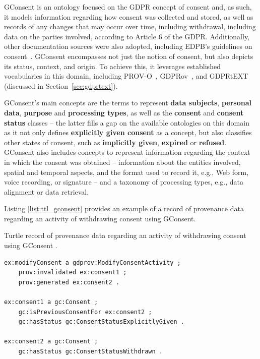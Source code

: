 GConsent \citep{hitzler_gconsent_2019} is an ontology focused on the GDPR concept of consent and, as such, it models information regarding how consent was collected and stored, as well as records of any changes that may occur over time, including withdrawal, including data on the parties involved, according to Article 6 of the GDPR.
Additionally, other documentation sources were also adopted, including EDPB's guidelines on consent~\citep{european_data_protection_board_guidelines_2020}.
GConsent encompasses not just the notion of consent, but also depicts its status, context, and origin.
To achieve this, it leverages established vocabularies in this domain, including PROV-O~\citep{lebo_prov-o_2013}, GDPRov~\citep{pandit_modelling_2017}, and GDPRtEXT~\citep{gangemi_gdprtext_2018} (discussed in Section~\ref{sec:gdprtext}).

GConsent's main concepts are the terms to represent \textbf{data subjects}, \textbf{personal data}, \textbf{purpose} and \textbf{processing types}, as well as the \textbf{consent} and \textbf{consent status} classes -- the latter fills a gap on the available ontologies on this domain as it not only defines \textbf{explicitly given consent} as a concept, but also classifies other states of consent, such as \textbf{implicitly given}, \textbf{expired} or \textbf{refused}.
GConsent also includes concepts to represent information regarding the context in which the consent was obtained -- information about the entities involved, spatial and temporal aspects, and the format used to record it, e.g., Web form, voice recording, or signature -- and a taxonomy of processing types, e.g., data alignment or data retrieval.

Listing \ref{list:ttl_gconsent} provides an example of a record of provenance data regarding an activity of withdrawing consent using GConsent.

\begin{listing}[ht]
\caption[Withdrawing consent with GConsent.]{Turtle record of provenance data regarding an activity of withdrawing consent using GConsent \citep{hitzler_gconsent_2019}.}
\label{list:ttl_gconsent}
\begin{verbatim}
ex:modifyConsent a gdprov:ModifyConsentActivity ;
    prov:invalidated ex:consent1 ;
    prov:generated ex:consent2 .

ex:consent1 a gc:Consent ;
    gc:isPreviousConsentFor ex:consent2 ;
    gc:hasStatus gc:ConsentStatusExplicitlyGiven .

ex:consent2 a gc:Consent ;
    gc:hasStatus gc:ConsentStatusWithdrawn .
\end{verbatim}
\end{listing}

